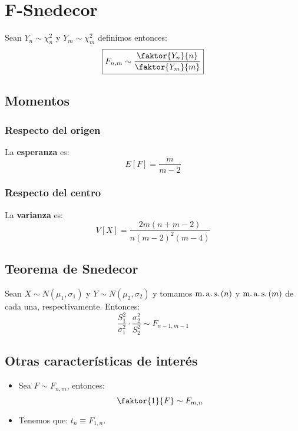 \section{F-Snedecor}
\label{sec:f_snedecor}
Sean $Y_n \sim \chi^2_n$ y $Y_m \sim \chi^2_m$ definimos entonces:
\[
\boxed{F_{n, m} \sim \frac{\faktor{Y_n}{n}}{\faktor{Y_m}{m}}}
\]

\subsection{Momentos}

\subsubsection*{Respecto del origen}
La \textbf{esperanza} es: 
\[
    E\left[ F \right] = \frac{m}{m - 2}
\]
\subsubsection*{Respecto del centro}
La \textbf{varianza} es:
\[
    V\left[ X \right] = \frac{2 m \left( n + m - 2 \right)}{n \left( m - 2 \right)^2 \left( m - 4 \right)}
\]

\subsection{Teorema de Snedecor}%
Sean $X \sim N\left( \mu_1, \sigma_1 \right)$ y $Y \sim N\left( \mu_2, \sigma_2 \right)$ y tomamos $\operatorname{m.a.s.}\left( n \right)$ y $\operatorname{m.a.s.}\left( m \right)$ de cada una, respectivamente.
Entonces:
\[
\boxed{\frac{S_1^2}{\sigma_1^2} \cdot \frac{\sigma_2^2}{S_2^2}\sim F_{n-1, m-1}}
\]

\subsection{Otras características de interés}
\begin{itemize}
    \item Sea $F \sim F_{n, m}$, entonces:
    \[
    \faktor{1}{F} \sim F_{m, n}
    \]
    \item Tenemos que: $t_n \equiv F_{1, n}$.
\end{itemize}
